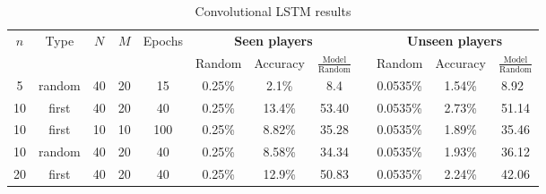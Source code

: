\begin{table}[ht]
    \centering
    \caption{Convolutional LSTM results}
    \begin{tabular}{cccccccccccc}
        \toprule
        $n$ & Type& $N$ & $M$ & Epochs & \multicolumn{3}{c}{\textbf{Seen players}} & & \multicolumn{3}{c}{\textbf{Unseen players}} \\
        & & & & & Random & Accuracy & $\frac{\text{Model}}{\text{Random}}$ & &  Random & Accuracy & $\frac{\text{Model}}{\text{Random}}$ \\
        \midrule
        5 & random & 40 & 20 & 15 & 0.25\% & 2.1\% & 8.4 & & 0.0535\% & 1.54\% & 8.92\ \\
        10 & first & 40 & 20 & 40 & 0.25\% & 13.4\% & 53.40 & & 0.0535\% & 2.73\% & 51.14 \\
        10 & first & 10 & 10 & 100 & 0.25\% & 8.82\% & 35.28 & & 0.0535\% & 1.89\% & 35.46 \\
        10 & random & 40 & 20 & 40 & 0.25\% & 8.58\% & 34.34 & & 0.0535\% & 1.93\% & 36.12 \\
        20 & first & 40 & 20 & 40 & 0.25\% & 12.9\% & 50.83 & & 0.0535\% & 2.24\% & 42.06 \\
         \bottomrule
    \end{tabular}
    \label{tab:conv_lstm}
\end{table} 

\newpage
